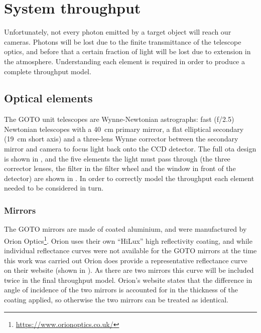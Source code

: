 \section{System throughput}
\label{sec:throughput}
\begin{colsection}


\begin{colsection}

Unfortunately, not every photon emitted by a target object will reach our cameras. Photons will be lost due to the finite transmittance of the telescope optics, and before that a certain fraction of light will be lost due to extension in the atmosphere. Understanding each element is required in order to produce a complete throughput model.

\end{colsection}

\subsection{Optical elements}
\label{sec:optics}
\begin{colsection}

The GOTO unit telescopes are Wynne-Newtonian astrographs: fast (f/2.5) Newtonian telescopes with a \SI{40}{\centi\meter} primary mirror, a flat elliptical secondary (\SI{19}{\centi\metre} short axis) and a three-lens Wynne corrector between the secondary mirror and camera to focus light back onto the CCD detector. The full \gls{ota} design is shown in , and the five elements the light must pass through (the three corrector lenses, the filter in the filter wheel and the window in front of the detector) are shown in . In order to correctly model the throughput each element needed to be considered in turn.

\subsubsection{Mirrors}

The GOTO mirrors are made of coated aluminium, and were manufactured by Orion Optics\footnote{\url{https://www.orionoptics.co.uk/}}. Orion uses their own ``HiLux'' high reflectivity coating, and while individual reflectance curves were not available for the GOTO mirrors at the time this work was carried out Orion does provide a representative reflectance curve on their website (shown in ). As there are two mirrors this curve will be included twice in the final throughput model. Orion's website states that the difference in angle of incidence of the two mirrors is accounted for in the thickness of the coating applied, so otherwise the two mirrors can be treated as identical.


\end{colsection}
\end{colsection}
